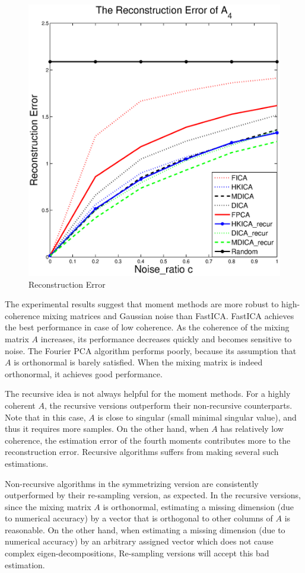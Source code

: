 \documentclass[twoside,11pt]{article}
\begin{document}
\begin{figure}[t]
	\includegraphics[width =0.49\columnwidth]{error4}
\caption{
\label{fig:Error}
 Reconstruction Error}
\end{figure}
The experimental results suggest that moment methods are more robust
to high-coherence mixing matrices and Gaussian noise than FastICA.
FastICA achieves the best performance in case of low coherence.
As the coherence of the mixing matrix $A$ increases, its performance decreases quickly and becomes sensitive to noise. 
The Fourier PCA algorithm performs poorly, because its assumption that
$A$ is orthonormal is barely satisfied. 
When the mixing matrix is indeed orthonormal, it achieves good performance.

The recursive idea is not always helpful for the moment methods. For a highly coherent $A$, the recursive versions outperform their non-recursive counterparts.
Note that in this case, $A$ is close to singular (small minimal
singular value), and thus it requires more samples.
On the other hand, when $A$ has relatively low coherence,  the estimation error of the fourth moments contributes more to the reconstruction error. 
Recursive algorithms suffers from making several such estimations.

Non-recursive algorithms in the symmetrizing version are consistently outperformed by their re-sampling version, as expected. 
In the recursive versions, since the mixing matrix $A$ is orthonormal, estimating a missing dimension (due to numerical accuracy) by a vector that is orthogonal to other columns of $A$ is reasonable. 
On the other hand, when estimating a missing dimension (due to numerical accuracy) by an arbitrary assigned vector which does not cause complex eigen-decompositions, Re-sampling versions will accept this bad estimation.
\fi
\end{document}
